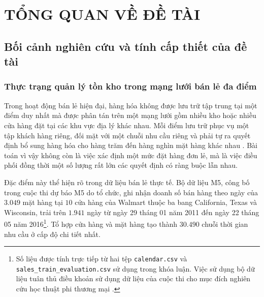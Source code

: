 %
%     
%
%

\chapter{TỔNG QUAN VỀ ĐỀ TÀI}
\label{chap:tongquan}

\section{Bối cảnh nghiên cứu và tính cấp thiết của đề tài}
\label{sec:boicanh}

\subsection{Thực trạng quản lý tồn kho trong mạng lưới bán lẻ đa điểm}
\label{subsec:thuctrang}

Trong hoạt động bán lẻ hiện đại, hàng hóa không được lưu trữ tập trung tại một
điểm duy nhất mà được phân tán trên một mạng lưới gồm nhiều kho hoặc nhiều cửa
hàng đặt tại các khu vực địa lý khác nhau. Mỗi điểm lưu trữ phục vụ một tập
khách hàng riêng, đối mặt với một chuỗi nhu cầu riêng và phải tự ra quyết định
bổ sung hàng hóa cho hàng trăm đến hàng nghìn mặt hàng khác nhau
\parencite{silver2016}. Bài toán vì vậy không còn là việc xác định một mức đặt
hàng đơn lẻ, mà là việc điều phối đồng thời một số lượng rất lớn các quyết định
có ràng buộc lẫn nhau.

Đặc điểm này thể hiện rõ trong dữ liệu bán lẻ thực tế. Bộ dữ liệu M5, công bố
trong cuộc thi dự báo M5 do \textcite{makridakis2022background} tổ chức, ghi
nhận doanh số bán hàng theo ngày của $3.049$ mặt hàng tại $10$ cửa hàng của
Walmart thuộc ba bang California, Texas và Wisconsin, trải trên $1.941$ ngày từ
ngày 29 tháng 01 năm 2011 đến ngày 22 tháng 05 năm
2016\footnote{Số liệu được tính trực tiếp từ hai tệp \texttt{calendar.csv} và
\texttt{sales\_train\_evaluation.csv} sử dụng trong khóa luận. Việc sử dụng bộ
dữ liệu tuân thủ điều khoản sử dụng dữ liệu của cuộc thi cho mục đích nghiên
cứu học thuật phi thương mại \parencite{m5dataset}.}. Tổ hợp cửa hàng và mặt
hàng tạo thành $30.490$ chuỗi thời gian nhu cầu ở cấp độ chi tiết nhất.

